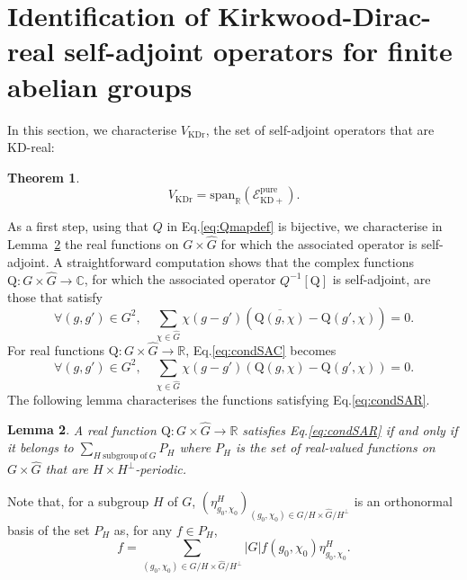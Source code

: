 \documentclass[a4paper, notitlepage, 11pt]{article}
\numberwithin{equation}{section}
\newcommand{\mcl}[1]{\ensuremath{\mathcal{#1}}}
\newcommand{\EcalKDCpu}{{\mcl E}_{\mathrm{KD+}}^{\mathrm{pure}}}
\newcommand{\R}{\mathbb{R}}
\newcommand{\C}{\ensuremath{\mathbb{C}}}
\newcommand{\card}[1]{\left|#1\right|}
\newcommand{\VR}{V_{\mathrm{KDr}}}
\newtheorem{Theorem}{Theorem}[section]
\newtheorem{Lemma}[Theorem]{Lemma}
\begin{document}
\section{Identification of Kirkwood-Dirac-real self-adjoint operators for finite abelian groups}
\label{sec:IdKDreal}
 In this section, we  characterise $\VR$, the set of self-adjoint operators that are KD-real:
\begin{Theorem}\label{thm:VKDr}
\begin{equation}\label{eq:VKDr}
\VR = \mathrm{span}_{\R}(\EcalKDCpu).
\end{equation}
\end{Theorem}
As a first step, using that $Q$ in Eq.\eqref{eq:Qmapdef} is bijective, we characterise in Lemma~\ref{lem:RealKD} the real functions on $G\times\widehat{G}$ for which the associated operator is self-adjoint.
A straightforward computation shows that the complex functions $\mathrm{Q}: G\times \hat{G} \to \C$, for which the associated operator $Q^{-1}[\mathrm{Q}]$ is self-adjoint, are those that satisfy
\begin{equation}\label{eq:condSAC}
     \forall (g,g')\in G^2, \quad \sum_{\chi\in \hat{G}} \chi(g-g')\left(\overline{\mathrm{Q}(g,\chi)} - \mathrm{Q}(g',\chi)\right)= 0.
\end{equation}
For real functions $\mathrm{Q}:G\times \hat{G} \to \R$, Eq.\eqref{eq:condSAC} becomes
\begin{equation}\label{eq:condSAR}
     \forall (g,g')\in G^2, \quad \sum_{\chi\in \hat{G}} \chi(g-g')\left(\mathrm{Q}(g,\chi) - \mathrm{Q}(g',\chi)\right)= 0.
\end{equation}
The following lemma characterises the functions satisfying Eq.\eqref{eq:condSAR}.

\begin{Lemma}\label{lem:RealKD}
    A real function $\mathrm{Q}: G\times \hat{G} \to \R$ satisfies Eq.\eqref{eq:condSAR} if and only if it belongs to $\sum_{H \mathrm{ \ subgroup \ of \ } G} P_{H}$ where $P_{H}$ is the set of real-valued functions on $G\times \hat{G}$ that are $H\times H^{\perp}$-periodic.
\end{Lemma}

Note that, for a subgroup $H$ of $G$, $(\eta^{H}_{g_0,\chi_0})_{(g_0,\chi_0)\in G/H\times\hat{G}/H^{\perp}}$ is an orthonormal basis of the set $P_{H}$ as, for any $f\in P_{H}$,
\begin{equation}\label{eq:PH1}
    f = \sum_{(g_0,\chi_0)\in G/H\times\hat{G}/H^{\perp}} \card{G}f(g_0,\chi_0)\eta^{H}_{g_0,\chi_0}.
\end{equation}
\end{document}
